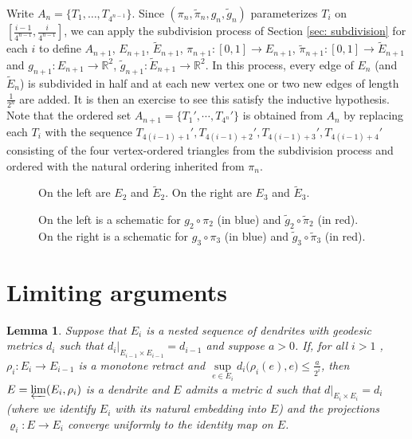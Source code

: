 \documentclass[11pt, leqno]{amsart}
\newtheorem{lemma}[theorem]{Lemma}
\theoremstyle{definition}\newtheorem{definition}[theorem]{Definition}
\begin{document}
Write $A_n=\{T_1, \dots, T_{4^{n-1}}\}$. Since $(\pi_n, \tilde \pi_n, g_n, \tilde g_n) $ parameterizes $T_i$ on $[\frac{i-1}{4^{n-1}},\frac{i}{4^{n-1}}]$, we can apply the subdivision process of Section \ref{sec: subdivision} for each $i$ to define $A_{n+1}$, $E_{n+1}$, $\tilde E_{n+1}$, $\pi_{n+1}: [0,1]\to E_{n+1}$, $\tilde\pi_{n+1}: [0,1]\to \tilde E_{n+1}$ and  $g_{n+1}: E_{n+1}\to \mathbb{R}^2$, $\tilde g_{n+1}: \tilde E_{n+1}\to \mathbb{R}^2$.  In this process, every edge of $E_n$ (and $\tilde E_n$) is subdivided in half and at each new vertex one or two new edges of length $\frac{1}{2^n}$ are added.  It is then an exercise to see this satisfy the inductive hypothesis. Note that the ordered set $A_{n+1}=\{T_1', \cdots, T_{4^n}'\}$  is obtained from $A_n$ by replacing each $T_i$ with the sequence $T_{4(i-1) +1}',T_{4(i-1) +2}',T_{4(i-1) +3}',T_{4(i-1) +4}'$ consisting of the four vertex-ordered triangles from the subdivision process and ordered with the natural ordering inherited from $\pi_n$.

\begin{figure}[h]
    \centering
        {\tiny\def\svgwidth{\textwidth}}
    \caption{On the left are $E_2$ and $\tilde E_2$.  On the right are $E_3$ and $\tilde E_3$.}
    \label{fig:Tree steps}
\end{figure}

\newpage

\begin{figure}[h]
    \centering
        {\tiny\def\svgwidth{\textwidth}}
    \caption{On the left is a schematic for $g_2\circ \pi_2$ (in blue) and $\tilde g_2\circ \tilde \pi_2$ (in red).
    On the right is a schematic for $g_3\circ \pi_3$ (in blue) and $\tilde g_3\circ \tilde \pi_3$ (in red).}
    \label{fig:Step3}
\end{figure}

\section{Limiting arguments}\label{sectionlimiting}


\begin{lemma}\label{lem: the dendrite}
Suppose that $E_i$ is a nested sequence of dendrites with geodesic metrics $d_i$ such that $d_{i}|_{E_{i-1}\times E_{i-1}} = d_{i-1}$ and suppose $a>0$. If, for all $i>1$ , $\rho_i:E_i\to E_{i-1}$ is a monotone retract and $\sup\limits_{e\in E_i}d_i\big(\rho_i(e), e\big)\leq \frac{a}{2^i}$, then $E = \varprojlim(E_i, \rho_i)$ is a dendrite and  $E$ admits a metric $d$ such that  $d|_{E_i\times E_i}= d_i$ (where we identify $E_i$ with its natural embedding into $E$) and the projections $\varrho_i: E\to E_i$ converge uniformly to the identity map on $E$.
\end{lemma}
\end{document}
